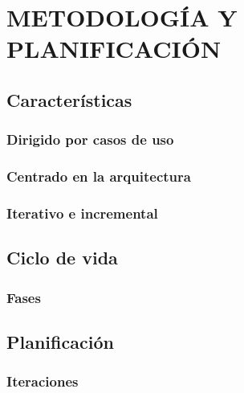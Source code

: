 \chapter[Metodología y planificación]{
  \label{chp:metodologia}
  METODOLOGÍA Y PLANIFICACIÓN
}
\thispagestyle{numberingStyle}
\pagestyle{numberingStyle}


\section{Características}
\subsection{Dirigido por casos de uso}
\subsection{Centrado en la arquitectura}
\subsection{Iterativo e incremental}

\section{Ciclo de vida}
\subsection{Fases}


\section{Planificación}
\subsection{Iteraciones}